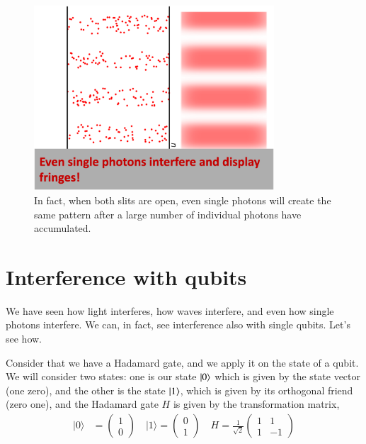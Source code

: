 \begin{figure}[H]
   \centering
    \includegraphics[width=0.8\textwidth]{lesson6/block_neither_reality.png}    
        \caption{In fact, when both slits are open, even single photons will create the same pattern after a large number of individual photons have accumulated.}
        \label{fig:two-slit-single-photon-pattern}

\end{figure}


\section{Interference with qubits}




We have seen how light interferes, how waves interfere, and even how single photons interfere. We can, in fact, see interference also with single qubits. Let's see how.

Consider that we have a Hadamard gate, and we apply it on the state of a qubit. We will consider two states: one is our state $\left| 0 \right\rangle$ which is given by the state vector (one zero), and the other is the state $\left| 1 \right\rangle$, which is given by its orthogonal friend (zero one), and the Hadamard gate $H$ is given by the transformation matrix,
\begin{equation}
\begin{aligned}
|0\rangle &=\left(\begin{array}{l}
1 \\
0
\end{array}\right) \quad|1\rangle=\left(\begin{array}{l}
0 \\
1
\end{array}\right) \quad H=\frac{1}{\sqrt{2}}\left(\begin{array}{cc}
1 & 1 \\
1 & -1
\end{array}\right)
\end{aligned}
\end{equation}


